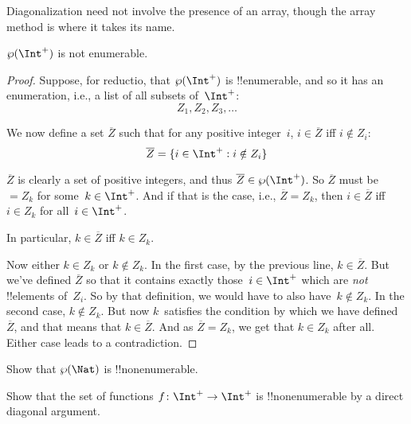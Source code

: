 \documentclass[../../../include/open-logic-section]{subfiles}
\begin{document}
Diagonalization need not involve the presence of an array, though the
array method is where it takes its name.

\begin{thm}
$\Pow{\Int^+}$ is not enumerable.
\end{thm}

\begin{proof}
Suppose, for reductio, that $\Pow{\Int^+}$ is !!{enumerable}, and so
it has an enumeration, i.e., a list of all subsets of~$\Int^+$:
\[
Z_{1}, Z_{2}, Z_{3}, \dots
\]

We now define a set $\overline{Z}$ such that for any positive
integer~$i$, $i \in \overline{Z}$ iff $i \notin Z_{i}$:
\[
\overline{Z} = \Setabs{i \in \Int^+}{i \notin Z_i}
\]

$\overline{Z}$ is clearly a set of positive integers, and thus $\overline{Z}
\in \Pow{\Int^+}$. So $\overline{Z}$ must be $= Z_k$ for some~$k \in
\Int^+$. And if that is the case, i.e., $\overline{Z} = Z_k$, then $i
\in \overline{Z}$ iff $i \in Z_k$ for all~$i \in \Int^+$.

In particular, $k \in \overline{Z}$ iff $k \in Z_k$.

Now either $k \in Z_{k}$ or $k \notin Z_{k}$. In the first case, by
the previous line, $k \in \overline{Z}$. But we've defined
$\overline{Z}$ so that it contains exactly those~$i \in \Int^+$ which
are \emph{not} !!{element}s of~$Z_i$. So by that definition, we would
have to also have~$k \notin Z_k$. In the second case, $k \notin Z_k$.
But now $k$~satisfies the condition by which we have
defined~$\overline{Z}$, and that means that $k \in \overline{Z}$. And
as $\overline{Z} = Z_k$, we get that $k \in Z_k$ after all. Either
case leads to a contradiction.
\end{proof}

\begin{prob}
Show that $\Pow{\Nat}$ is !!{nonenumerable}.
\end{prob}

\begin{prob}
Show that the set of functions $f \colon \Int^+ \to \Int^+$ is
!!{nonenumerable} by a direct diagonal argument.
\end{prob}
\end{document}
